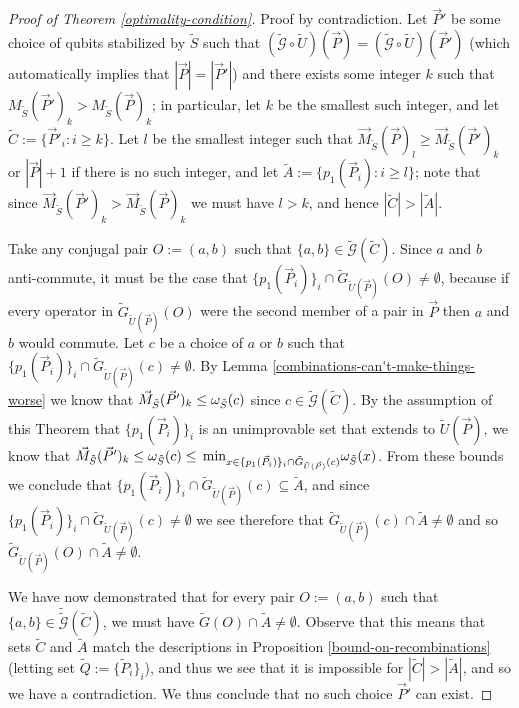 \documentclass[twocolumn,showpacs,preprintnumbers,amsmath,amssymb,nofootinbib,pra,floatfix]{revtex4-1}
\newcommand{\lst}{\vec}
\newcommand{\set}{\tilde}
\newcommand{\genfun}{\tilde{\mathcal{G}}}
\begin{document}
\begin{proof}[Proof of Theorem \ref{optimality-condition}]
Proof by contradiction.  Let $\lst P'$ be some choice of qubits stabilized by $\set S$ such that $(\genfun\circ\set U)(\lst P)=(\genfun\circ\set U)(\lst P')$ (which automatically implies that $|\lst P|=|\lst P'|$) and there exists some integer $k$ such that $M_{\set S}(\lst P')_k > M_{\set S}(\lst P)_k$;  in particular, let $k$ be the smallest such integer, and let $\set C:=\{\lst P'_i : i \ge k\}$.  Let $l$ be the smallest integer such that $\lst M_{\set S}(\lst P)_l\ge \lst M_{\set S}(\lst P')_k$ or $|\lst P|+1$ if there is no such integer, and let $\set A := \{p_1(\lst P_i) : i \ge l\}$; note that since $\lst M_{\set S}(\lst P')_k > \lst M_{\set S}(\lst P)_k$ we must have $l>k$, and hence $|\set C| > |\set A|$.

Take any conjugal pair $O:=(a,b)$ such that $\{a,b\}\in\genfun(\set C)$.  Since $a$ and $b$ anti-commute, it must be the case that $\{p_1(\lst P_i)\}_i\cap \set G_{\set U(\lst P)}(O)\ne\emptyset$, because if every operator in $\set G_{\set U(\lst P)}(O)$ were the second member of a pair in $\lst P$ then $a$ and $b$ would commute.  Let $c$ be a choice of $a$ or $b$ such that $\{p_1(\lst P_i)\}_i\cap \set G_{\set U(\lst P)}(c)\ne\emptyset$.  By Lemma \ref{combinations-can't-make-things-worse} we know that $\lst M_{\set S}(\lst P')_k\le\om_{\set S}(c)$ since $c\in\genfun(\set C)$.  By the assumption of this Theorem that $\{p_1(\lst P_i)\}_i$ is an unimprovable set that extends to $\set U(\lst P)$, we know that $\lst M_{\set S}(\lst P')_k \le \om_{\set S}(c)\le\min_{x\in\{p_1(\lst P_i)\}_i\cap \set G_{\set U(\lst P)}(c)} \om_{\set S}(x)$.  From these bounds we conclude that $\{p_1(\lst P_i)\}_i\cap \set G_{\set U(\lst P)}(c)\subseteq \set A$, and since $\{p_1(\lst P_i)\}_i\cap \set G_{\set U(\lst P)}(c)\ne\emptyset$ we see therefore that $\set G_{\set U(\lst P)}(c)\cap\set A\ne\emptyset$ and so $\set G_{\set U(\lst P)}(O)\cap\set A\ne\emptyset$.

We have now demonstrated that for every pair $O:=(a,b)$ such that $\{a,b\}\in\set \genfun(\set C)$, we must have $\set G(O)\cap\set A \ne\emptyset$.  Observe that this means that sets $\set C$ and $\set A$ match the descriptions in Proposition \ref{bound-on-recombinations} (letting set $\set Q:=\{\set P_i\}_i$), and thus we see that it is impossible for $|\set C|>|\set A|$, and so we have a contradiction.  We thus conclude that no such choice $\lst P'$ can exist.
\end{proof}
\end{document}
